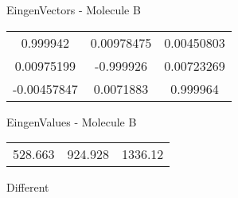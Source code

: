 \begin{multicols}{2}
\begin{center}
\vtab
 EingenVectors - Molecule B     \\
\vtab
\begin{tabular}{|c c c|}
0.999942	 & 	0.00978475	 & 	0.00450803	 \\
0.00975199	 & 	-0.999926	 & 	0.00723269	 \\
-0.00457847	 & 	0.0071883	 & 	0.999964
\end{tabular}

\vtab
 EingenValues - Molecule B     \\
\vtab
\begin{tabular}{|c c c|}
528.663	 & 	924.928	 & 	1336.12	 \\
\end{tabular}

\end{center}
\end{multicols}
\begin{center}
\vtab
\vtab
\textcolor{NavyBlue}{\Large Different}
\end{center}

 \newpage

